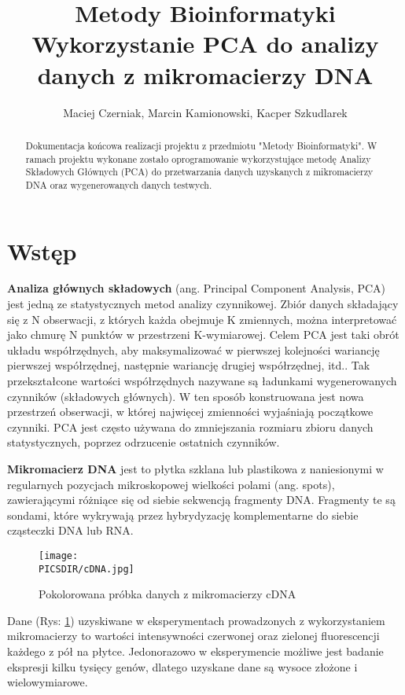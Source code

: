 \documentclass[a4paper,12pt]{article}
\def\PICSDIR{PICS}
\begin{document}
\title{{\small Metody Bioinformatyki}\\Wykorzystanie PCA do analizy danych z mikromacierzy DNA}
\author{Maciej Czerniak, Marcin Kamionowski, Kacper Szkudlarek}

\maketitle

\begin{abstract}
Dokumentacja końcowa realizacji projektu z przedmiotu "Metody Bioinformatyki". W ramach projektu wykonane zostało oprogramowanie wykorzystujące metodę Analizy Składowych Głównych (PCA) do przetwarzania danych uzyskanych z mikromacierzy DNA oraz wygenerowanych danych testwych.
\end{abstract}


\section{Wstęp}
\textbf{Analiza głównych składowych} (ang. Principal Component Analysis, PCA) jest jedną ze statystycznych metod analizy czynnikowej. Zbiór danych składający się z N obserwacji, z których każda obejmuje K zmiennych, można interpretować jako chmurę N punktów w przestrzeni K-wymiarowej. Celem PCA jest taki obrót układu współrzędnych, aby maksymalizować w pierwszej kolejności wariancję pierwszej współrzędnej, następnie wariancję drugiej współrzędnej, itd.. Tak przekształcone wartości współrzędnych nazywane są ładunkami wygenerowanych czynników (składowych głównych). W ten sposób konstruowana jest nowa przestrzeń obserwacji, w której najwięcej zmienności wyjaśniają początkowe czynniki. PCA jest często używana do zmniejszania rozmiaru zbioru danych statystycznych, poprzez odrzucenie ostatnich czynników.

\textbf{Mikromacierz DNA} jest to płytka szklana lub plastikowa z naniesionymi w regularnych pozycjach mikroskopowej wielkości polami (ang. spots), zawierającymi różniące się od siebie sekwencją fragmenty DNA. Fragmenty te są sondami, które wykrywają przez hybrydyzację komplementarne do siebie cząsteczki DNA lub RNA.

\begin{figure}
\centering
\texttt{[image: \\PICSDIR/cDNA.jpg]}
\caption{Pokolorowana próbka danych z mikromacierzy cDNA}
\label{rys:cDNA}
\end{figure}

Dane (Rys: \ref{rys:cDNA}) uzyskiwane w eksperymentach prowadzonych z wykorzystaniem mikromacierzy to wartości intensywności czerwonej oraz zielonej fluorescencji każdego z pół na płytce. Jedonorazowo w eksperymencie możliwe jest badanie ekspresji kilku tysięcy genów, dlatego uzyskane dane są wysoce złożone i wielowymiarowe.
\end{document}
